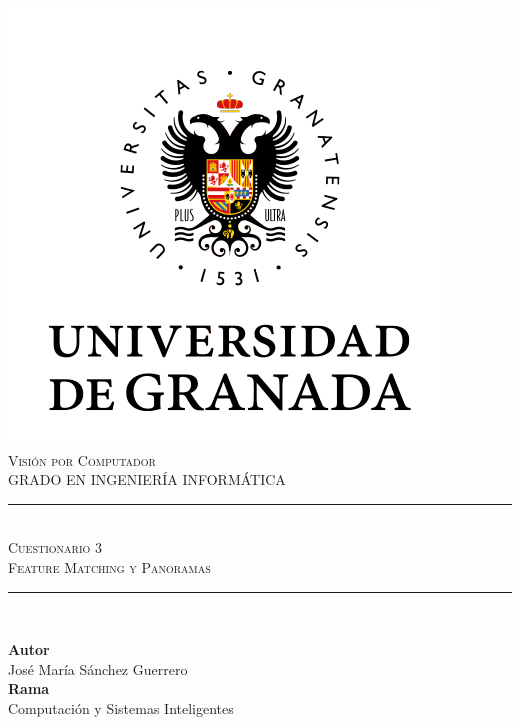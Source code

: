 \documentclass[11pt,a4paper]{article}
\newcommand{\asignatura}{Visión por Computador}
\newcommand{\autor}{José María Sánchez Guerrero}
\newcommand{\titulo}{Cuestionario 3}
\newcommand{\subtitulo}{Feature Matching y Panoramas}
\begin{document}

\begin{titlepage}

\begin{minipage}{\textwidth}

\centering

\includegraphics[scale=0.5]{img/ugr.png}\\

\textsc{\Large \asignatura{}\\[0.2cm]}
\textsc{GRADO EN INGENIERÍA INFORMÁTICA}\\[1cm]

\noindent\rule[-1ex]{\textwidth}{1pt}\\[1.5ex]
\textsc{{\Huge \titulo\\[0.5ex]}}
\textsc{{\Large \subtitulo\\}}
\noindent\rule[-1ex]{\textwidth}{2pt}\\[3.5ex]

\end{minipage}

\vspace{0.5cm}

\begin{minipage}{\textwidth}

\centering

\textbf{Autor}\\ {\autor{}}\\[2.5ex]
\textbf{Rama}\\ {Computación y Sistemas Inteligentes}\\[2.5ex]
\vspace{0.3cm}


\end{minipage}
\end{titlepage}
\end{document}
